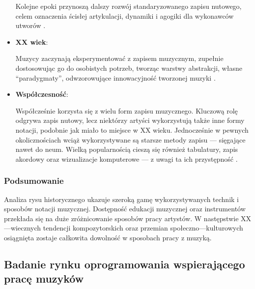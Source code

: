 \begin{itemize}
	      Kolejne epoki przynoszą dalszy rozwój standaryzowanego zapisu nutowego, celem oznaczenia ścisłej artykulacji, dynamiki i agogiki
	      dla wykonawców utworów \cite{abc}.
	\item \textbf{XX wiek}:

	      Muzycy zaczynają eksperymentować z zapisem muzycznym, zupełnie dostosowując go do osobistych potrzeb, tworząc warstwy abstrakcji,
	      własne \enquote{paradygmaty}, odwzorowujące innowacyjność tworzonej muzyki \cite{atlas2}.
	\item \textbf{Współczesność}:

	      Współcześnie korzysta się z wielu form zapisu muzycznego. Kluczową rolę odgrywa zapis nutowy,
	      lecz niektórzy artyści wykorzystują także inne formy notacji, podobnie jak miało to miejsce w XX wieku.
	      Jednocześnie w pewnych okolicznościach wciąż wykorzystywane są starsze metody zapisu — sięgające nawet do neum.
	      Wielką popularnością cieszą się również tabulatury, zapis akordowy oraz wizualizacje komputerowe — z uwagi ta ich przystępność \cite{modern}.
\end{itemize}

\subsubsection{Podsumowanie}
Analiza rysu historycznego ukazuje szeroką gamę wykorzystywanych technik i sposobów notacji muzycznej. Dostępność edukacji muzycznej
oraz instrumentów przekłada się na duże zróżnicowanie sposobów pracy artystów. W następstwie XX—wiecznych tendencji kompozytorskich
oraz przemian społeczno—kulturowych osiągnięta zostaje całkowita dowolność w sposobach pracy z muzyką.

\subsection{Badanie rynku oprogramowania wspierającego pracę muzyków}
